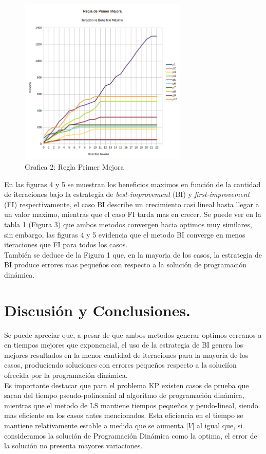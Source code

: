 \documentclass{ci5652}
\begin{document}
 	\begin{figure}[h]
 	\caption{Grafica 2: Regla Primer Mejora}
	\includegraphics[width=8cm, height=8cm]{first_imp-it-vs-ben_max.png}
	\end{figure}

	En las figuras 4 y 5 se muestran los beneficios maximos en función de la cantidad de iteraciones bajo la estrategia de \textit{best-improvement} (BI) y \textit{first-improvement} (FI) respectivamente, el caso BI describe un crecimiento casi lineal hasta llegar a un valor maximo, mientras que el caso FI tarda mas en crecer. Se puede ver en la tabla 1 (Figura 3) que ambos metodos convergen hacia optimos muy similares, sin embargo, las figuras 4 y 5 evidencia que el metodo BI converge en menos iteraciones que FI para todos los casos.\\
	También se deduce de la Figura 1 que, en la mayoria de los casos, la estrategia de BI produce errores mas pequeños con respecto a la solución de programación dinámica.\\


\section{Discusión y Conclusiones.}
	Se puede apreciar que, a pesar de que ambos metodos generar optimos cercanos a en tiempos mejores que exponencial, el uso de la estrategia de BI genera los mejores resultados en la menor cantidad de iteraciones para la mayoria de los casos, produciendo soluciones con errores pequeños respecto a la soluciíon ofrecida por la programación dinámica.\\

	Es importante destacar que para el problema KP existen casos de prueba que sacan del tiempo pseudo-polinomial al algoritmo de programación dinámica, mientras que el metodo de LS mantiene tiempos pequeños y peudo-lineal, siendo mas eficiente en los casos antes mencionados. Esta eficiencia en el tiempo se mantiene relativamente estable a medida que se aumenta $|V|$ al igual que, si consideramos la solución de Programación Dinámica como la optima, el error de la solución no presenta mayores variaciones.\\
\end{document}
